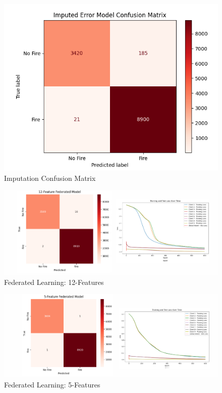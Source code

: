 \documentclass[conference]{IEEEtran}
\begin{document}
\begin{figure}[htbp]
    \centering
    \includegraphics[width=0.75\linewidth]{images/ImputationCM.png}
    \caption{Imputation Confusion Matrix}
    \label{fig:errcm}
\end{figure}


\begin{figure}[htbp]
    \centering
    \includegraphics[width=1\linewidth]{images/12Fed.png}
    \caption{Federated Learning: 12-Features}
    \label{fig:fed12}
\end{figure}

\begin{figure}[htbp]
    \centering
    \includegraphics[width=1\linewidth]{images/5Fed.png}
    \caption{Federated Learning: 5-Features}
    \label{fig:fed5}
\end{figure}
\end{document}
